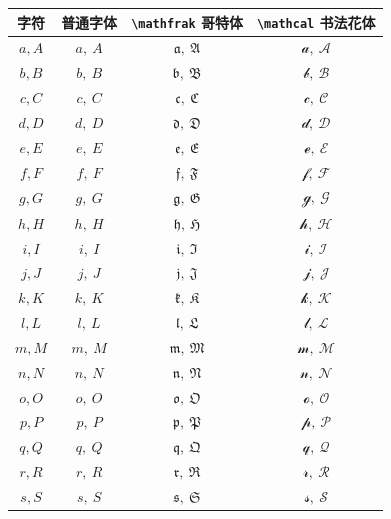 \documentclass{ctexart}
\begin{document}
\begin{center}
\renewcommand{\arraystretch}{1.4}
\begin{tabular}{c c c c}
\toprule
字符 & 普通字体 & \verb|\mathfrak| 哥特体 & \verb|\mathcal| 书法花体 \\
\midrule
$a, A$ & $a,\ A$ & $\mathfrak{a},\ \mathfrak{A}$ & $\mathcal{a},\ \mathcal{A}$ \\
$b, B$ & $b,\ B$ & $\mathfrak{b},\ \mathfrak{B}$ & $\mathcal{b},\ \mathcal{B}$ \\
$c, C$ & $c,\ C$ & $\mathfrak{c},\ \mathfrak{C}$ & $\mathcal{c},\ \mathcal{C}$ \\
$d, D$ & $d,\ D$ & $\mathfrak{d},\ \mathfrak{D}$ & $\mathcal{d},\ \mathcal{D}$ \\
$e, E$ & $e,\ E$ & $\mathfrak{e},\ \mathfrak{E}$ & $\mathcal{e},\ \mathcal{E}$ \\
$f, F$ & $f,\ F$ & $\mathfrak{f},\ \mathfrak{F}$ & $\mathcal{f},\ \mathcal{F}$ \\
$g, G$ & $g,\ G$ & $\mathfrak{g},\ \mathfrak{G}$ & $\mathcal{g},\ \mathcal{G}$ \\
$h, H$ & $h,\ H$ & $\mathfrak{h},\ \mathfrak{H}$ & $\mathcal{h},\ \mathcal{H}$ \\
$i, I$ & $i,\ I$ & $\mathfrak{i},\ \mathfrak{I}$ & $\mathcal{i},\ \mathcal{I}$ \\
$j, J$ & $j,\ J$ & $\mathfrak{j},\ \mathfrak{J}$ & $\mathcal{j},\ \mathcal{J}$ \\
$k, K$ & $k,\ K$ & $\mathfrak{k},\ \mathfrak{K}$ & $\mathcal{k},\ \mathcal{K}$ \\
$l, L$ & $l,\ L$ & $\mathfrak{l},\ \mathfrak{L}$ & $\mathcal{l},\ \mathcal{L}$ \\
$m, M$ & $m,\ M$ & $\mathfrak{m},\ \mathfrak{M}$ & $\mathcal{m},\ \mathcal{M}$ \\
$n, N$ & $n,\ N$ & $\mathfrak{n},\ \mathfrak{N}$ & $\mathcal{n},\ \mathcal{N}$ \\
$o, O$ & $o,\ O$ & $\mathfrak{o},\ \mathfrak{O}$ & $\mathcal{o},\ \mathcal{O}$ \\
$p, P$ & $p,\ P$ & $\mathfrak{p},\ \mathfrak{P}$ & $\mathcal{p},\ \mathcal{P}$ \\
$q, Q$ & $q,\ Q$ & $\mathfrak{q},\ \mathfrak{Q}$ & $\mathcal{q},\ \mathcal{Q}$ \\
$r, R$ & $r,\ R$ & $\mathfrak{r},\ \mathfrak{R}$ & $\mathcal{r},\ \mathcal{R}$ \\
$s, S$ & $s,\ S$ & $\mathfrak{s},\ \mathfrak{S}$ & $\mathcal{s},\ \mathcal{S}$ \\

\end{tabular}
\end{center}
\end{document}
